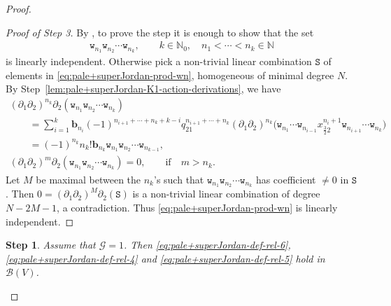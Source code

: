 \documentclass[pdftex]{sigma}
\numberwithin{equation}{section}
\newtheorem{stepv}{Step}
\newcommand{\toba}{\mathscr B}
\newcommand{\ghost}{\mathscr{G}}
\newcommand{\bb}{\mathbf b}
\newcommand{\N}{{\mathbb N}}
\newcommand{\wt}{\mathtt{w}}
\newcommand{\tresdos}{\frac{3}{2}}
\begin{document}
\begin{proof}
\begin{proof}[Proof of Step 3]
By \cite[Lemma~2.3.4]{AAH-triang}, to prove the step it is enough to show that the set
\begin{gather}\label{eq:pale+superJordan-prod-wn}
 \wt_{n_1}\wt_{n_2}\cdots \wt_{n_k}, \qquad
 k\in\mathbb N_0, \quad n_1< \cdots< n_k \in\N
\end{gather}
is linearly independent.
Otherwise pick a non-trivial linear combination $\mathtt S$ of elements in \eqref{eq:pale+superJordan-prod-wn},
homogeneous of minimal degree $N$. By Step~\ref{lem:pale+superJordan-K1-action-derivations}, we have
\begin{gather*}
(\partial_1\partial_2)^{n_k}\partial_2 (\wt_{n_1}\wt_{n_2}\cdots \wt_{n_k})
\\ \qquad
{}= \sum_{i=1}^k \bb_{n_i}(-1)^{n_{i+1}+\cdots+n_k+k-i} q_{21}^{n_{i+1}+\cdots+n_k}
(\partial_1\partial_2)^{n_k} \big(\wt_{n_1}\cdots \wt_{n_{i-1}} x_{\tresdos2}^{n_i+1}\wt_{n_{i+1}}\cdots \wt_{n_k}\big)
\\ \qquad
{} = (-1)^{n_k}n_k! \bb_{n_k} \wt_{n_1}\wt_{n_2}\cdots \wt_{n_{k-1}},
\\[1mm]
(\partial_1\partial_2)^{m}\partial_2 (\wt_{n_1}\wt_{n_2}\cdots \wt_{n_k}) =0, \qquad \text{if}\quad m>n_k.
\end{gather*}
Let $M$ be maximal between the $n_k$'s such that $\wt_{n_1}\wt_{n_2}\cdots \wt_{n_k}$ has
coefficient $\neq 0$ in $\mathtt S$.
Then $0=(\partial_1\partial_2)^{M}\partial_2(\mathtt S)$ is a non-trivial linear combination of degree $N-2M-1$,
a contradiction. Thus \eqref{eq:pale+superJordan-prod-wn} is linearly independent.
\end{proof}

\begin{stepv}
Assume that $\ghost = 1$. Then \eqref{eq:pale+superJordan-def-rel-6}, \eqref{eq:pale+superJordan-def-rel-4} and
\eqref{eq:pale+superJordan-def-rel-5} hold in $\toba(V)$.
\end{stepv}


\end{proof}
\end{document}
